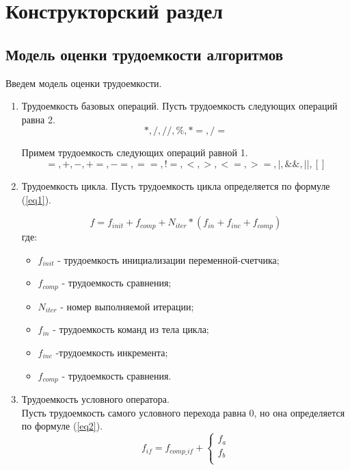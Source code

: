 \chapter{Конструкторский раздел}

\section{Модель оценки трудоемкости алгоритмов}
Введем модель оценки трудоемкости.

\begin{enumerate}
	\item Трудоемкость базовых операций.
	Пусть трудоемкость следующих операций равна 2. 
	$$*, /, //, \%, *=, /= $$
	
	Примем трудоемкость следующих операций равной 1.
	$$=, +, -, +=, -=, ==, !=, <, >, <=, >=, |, \&\&, ||, []$$  
	\item Трудоемкость цикла.
	Пусть трудоемкость цикла определяется по формуле (\ref{eq1}).
	
	\begin{equation}
		\label{eq1} 
		f = f_{init} + f_{comp} + N_{iter} * (f_{in} + f_{inc} + f_{comp})
	\end{equation} 
	где:
	\begin{itemize}
		\item $f_{init}$ - трудоемкость инициализации переменной-счетчика;
		\item $f_{comp}$ - трудоемкость сравнения;
		\item $N_{iter}$ - номер выполняемой итерации;
		\item $f_{in}$ - трудоемкость команд из тела цикла;
		\item $f_{inc}$ -трудоемкость инкремента;
		\item $f_{comp}$ - трудоемкость сравнения.
	\end{itemize}
	\item Трудоемкость условного оператора. \\
	Пусть трудоемкость самого условного перехода равна 0, но она определяется по формуле (\ref{eq2}). 
	\begin{equation}
		\label{eq2}
		f_{if} = f_{comp\_if} + \begin{cases}
			f_{a}\\
			f_{b}\\
		\end{cases}
	\end{equation}
	
\end{enumerate}

